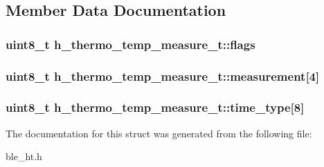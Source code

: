 \subsection{Member Data Documentation}
\hypertarget{structh__thermo__temp__measure__t_afce338fd434c1af7a9d5ef07e4b6d3ad}{
\subsubsection[{flags}]{\setlength{\rightskip}{0pt plus 5cm}uint8\-\_\-t h\-\_\-thermo\-\_\-temp\-\_\-measure\-\_\-t\-::flags}}\label{structh__thermo__temp__measure__t_afce338fd434c1af7a9d5ef07e4b6d3ad}
\hypertarget{structh__thermo__temp__measure__t_a5804c9b8d6bb0fefe6e7811a41445909}{
\subsubsection[{measurement}]{\setlength{\rightskip}{0pt plus 5cm}uint8\-\_\-t h\-\_\-thermo\-\_\-temp\-\_\-measure\-\_\-t\-::measurement\mbox{[}4\mbox{]}}}\label{structh__thermo__temp__measure__t_a5804c9b8d6bb0fefe6e7811a41445909}
\hypertarget{structh__thermo__temp__measure__t_ac2851384f5849c3f5e73d3397833b561}{
\subsubsection[{time\-\_\-type}]{\setlength{\rightskip}{0pt plus 5cm}uint8\-\_\-t h\-\_\-thermo\-\_\-temp\-\_\-measure\-\_\-t\-::time\-\_\-type\mbox{[}8\mbox{]}}}\label{structh__thermo__temp__measure__t_ac2851384f5849c3f5e73d3397833b561}


The documentation for this struct was generated from the following file\-:\begin{DoxyCompactItemize}
\item 
ble\-\_\-ht.\-h\end{DoxyCompactItemize}
